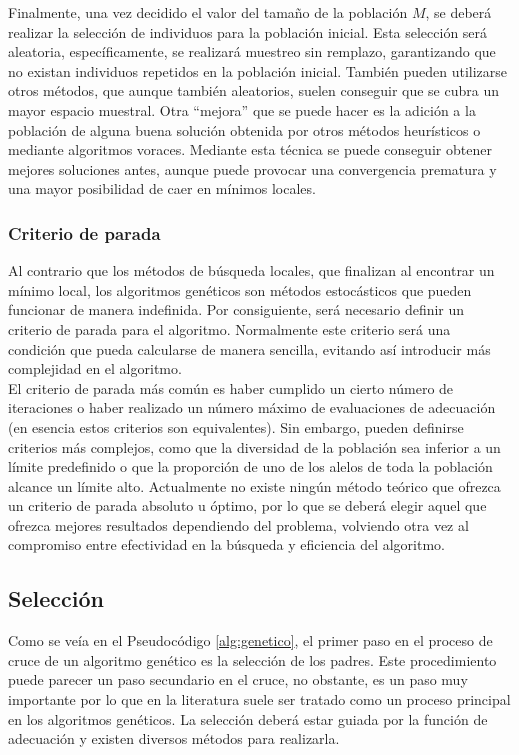 Finalmente, una vez decidido el valor del tamaño de la población $M$, se deberá realizar la selección de individuos para la población inicial. Esta selección será aleatoria, específicamente, se realizará muestreo sin remplazo, garantizando que no existan individuos repetidos en la población inicial. También pueden utilizarse otros métodos, que aunque también aleatorios, suelen conseguir que se cubra un mayor espacio muestral. Otra ``mejora'' que se puede hacer es la adición a la población de alguna buena solución obtenida por otros métodos heurísticos o mediante algoritmos voraces. Mediante esta técnica se puede conseguir obtener mejores soluciones antes, aunque puede provocar una convergencia prematura y una mayor posibilidad de caer en mínimos locales.

\subsubsection{Criterio de parada}\label{intro:sel-criterio}
Al contrario que los métodos de búsqueda locales, que finalizan al encontrar un mínimo local, los algoritmos genéticos son métodos estocásticos que pueden funcionar de manera indefinida. Por consiguiente, será necesario definir un criterio de parada para el algoritmo. Normalmente este criterio será una condición que pueda calcularse de manera sencilla, evitando así introducir más complejidad en el algoritmo.\\

El criterio de parada más común es haber cumplido un cierto número de iteraciones o haber realizado un número máximo de evaluaciones de adecuación (en esencia estos criterios son equivalentes). Sin embargo, pueden definirse criterios más complejos, como que la diversidad de la población sea inferior a un límite predefinido o que la proporción de uno de los alelos de toda la población alcance un límite alto. Actualmente no existe ningún método teórico que ofrezca un criterio de parada absoluto u óptimo, por lo que se deberá elegir aquel que ofrezca mejores resultados dependiendo del problema, volviendo otra vez al compromiso entre efectividad en la búsqueda y eficiencia del algoritmo.

\subsection{Selección}
Como se veía en el Pseudocódigo \ref{alg:genetico}, el primer paso en el proceso de cruce de un algoritmo genético es la selección de los padres. Este procedimiento puede parecer un paso secundario en el cruce, no obstante, es un paso muy importante por lo que en la literatura suele ser tratado como un proceso principal en los algoritmos genéticos. La selección deberá estar guiada por la función de adecuación y existen diversos métodos para realizarla.
